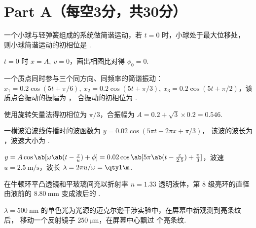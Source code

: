 \section{Part A（每空3分，共30分）}

\begin{problem}
  一个小球与轻弹簧组成的系统做简谐运动，若 $t = 0$ 时，小球处于最大位移处，
  则小球简谐运动的初相位是 .
\end{problem}
\begin{solution}
  $t = 0$ 时 $x = A,~ v = 0$，画出相图比对得 $\phi_0 = 0$.
\end{solution}

\begin{problem}
  一个质点同时参与三个同方向、同频率的简谐振动：
  $ x_1 = 0.2\cos(5t + \pi/6),~ x_2 = 0.2\cos(5t + \pi/3),~
    x_3 = 0.2\cos(5t + \pi/2)$，该质点合振动的振幅为 ，
  合振动的初相位为 .
\end{problem}
\begin{solution}
  使用旋转矢量法得初相位为 $\pi/3$，合振幅为 $A = 0.2 + \sqrt3 \times 0.2 = 0.546$.
\end{solution}

\begin{problem}
  一横波沿波线传播时的波函数为 $y = 0.02\cos(5\pi t - 2\pi x + \pi/3)$，
  该波的波长为 ，波速大小为 .
\end{problem}
\begin{solution}
  $ y = A\cos\ab[\omega\ab(t - \frac xu) + \phi]
      = 0.02\cos\ab[5\pi\ab(t - \frac{x}{2.5}) + \frac\pi3]
  $，波速 $u = \qty{2.5}{\m/\s}$，波长 $\lambda = 2\pi u/\omega = \qty1\m$.
\end{solution}

\begin{problem}
  在牛顿环平凸透镜和平玻璃间充以折射率 $n = 1.33$ 透明液体，第 $8$ 级亮环的直径由液前的
  $\qty{8.80}\mm$ 变成液后的 \result{$\qty{}\mm$}.
\end{problem}
\begin{solution}
  
\end{solution}

\begin{problem}
  $\lambda = \qty{500}\nm$ 的单色光为光源的迈克尔逊干涉实验中，在屏幕中新观测到亮条纹后，
  移动一个反射镜子 $\qty{250}\um$，在屏幕中心飘过 \result{} 个亮条纹.
\end{problem}
\begin{solution}
  
\end{solution}

